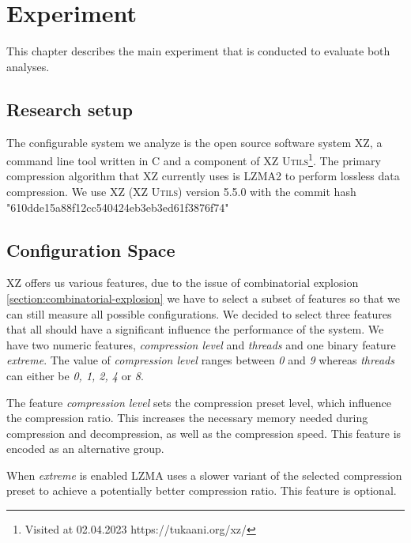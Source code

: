 \chapter{Experiment}\label{ch:experiment}

This chapter describes the main experiment that is conducted to evaluate both analyses.

\section{Research setup}\label{ch:Research-setup}

The configurable system we analyze is the open source software system \textsc{XZ}, a command line tool written in \textsc{C} and a component of
\textsc{XZ Utils}\footnote{Visited at 02.04.2023 https://tukaani.org/xz/}.  
The primary compression algorithm that \textsc{XZ} currently uses is \textsc{LZMA2} to perform lossless data compression.
We use \textsc{XZ} \textsc{(XZ Utils)} version 5.5.0 with the commit hash "610dde15a88f12cc540424eb3eb3ed61f3876f74"

\section{Configuration Space}
\textsc{XZ} offers us various features, due to the issue of combinatorial explosion \autoref{section:combinatorial-explosion} we 
have to select a subset of features so that we can still measure all possible configurations. We decided to select three features
that all should have a significant influence the performance of the system. We have two numeric features, \emph{compression level} and 
\emph{threads} and one binary feature \emph{extreme}. The value of \emph{compression level} ranges between \emph{0} and \emph{9} whereas \emph{threads} can either 
be \emph{0, 1, 2, 4} or \emph{8}. 

The feature \emph{compression level} sets the compression preset level, which influence the compression ratio.
This increases the necessary memory needed during compression and decompression, as well as the compression speed. 
This feature is encoded as an alternative group.

When \emph{extreme} is enabled \textsc{LZMA} uses a slower variant of the selected compression preset to achieve a potentially better compression ratio.
This feature is optional.


